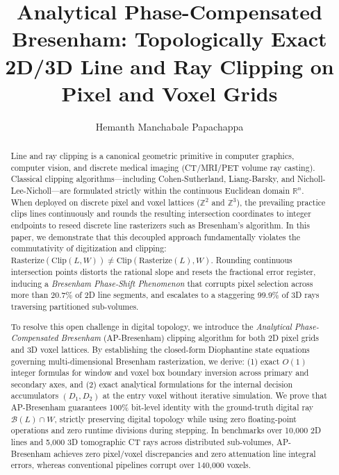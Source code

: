 \documentclass[runningheads]{llncs}
\begin{document}
%
\title{Analytical Phase-Compensated Bresenham: Topologically Exact 2D/3D Line and Ray Clipping on Pixel and Voxel Grids}
%
%
\author{Hemanth Manchabale Papachappa}
%
%
%
\maketitle              %
%
\begin{abstract}
Line and ray clipping is a canonical geometric primitive in computer graphics, computer vision, and discrete medical imaging (CT/MRI/PET volume ray casting). Classical clipping algorithms---including Cohen-Sutherland, Liang-Barsky, and Nicholl-Lee-Nicholl---are formulated strictly within the continuous Euclidean domain $\mathbb{R}^n$. When deployed on discrete pixel and voxel lattices ($\mathbb{Z}^2$ and $\mathbb{Z}^3$), the prevailing practice clips lines continuously and rounds the resulting intersection coordinates to integer endpoints to reseed discrete line rasterizers such as Bresenham's algorithm. In this paper, we demonstrate that this decoupled approach fundamentally violates the commutativity of digitization and clipping: $\mathrm{Rasterize}(\mathrm{Clip}(L, W)) \ne \mathrm{Clip}(\mathrm{Rasterize}(L), W)$. Rounding continuous intersection points distorts the rational slope and resets the fractional error register, inducing a \emph{Bresenham Phase-Shift Phenomenon} that corrupts pixel selection across more than 20.7\% of 2D line segments, and escalates to a staggering 99.9\% of 3D rays traversing partitioned sub-volumes.

To resolve this open challenge in digital topology, we introduce the \emph{Analytical Phase-Compensated Bresenham} (AP-Bresenham) clipping algorithm for both 2D pixel grids and 3D voxel lattices. By establishing the closed-form Diophantine state equations governing multi-dimensional Bresenham rasterization, we derive: (1) exact $O(1)$ integer formulas for window and voxel box boundary inversion across primary and secondary axes, and (2) exact analytical formulations for the internal decision accumulators $(D_1, D_2)$ at the entry voxel without iterative simulation. We prove that AP-Bresenham guarantees 100\% bit-level identity with the ground-truth digital ray $\mathcal{B}(L) \cap W$, strictly preserving digital topology while using zero floating-point operations and zero runtime divisions during stepping. In benchmarks over 10,000 2D lines and 5,000 3D tomographic CT rays across distributed sub-volumes, AP-Bresenham achieves zero pixel/voxel discrepancies and zero attenuation line integral errors, whereas conventional pipelines corrupt over 140,000 voxels.

\end{abstract}
%
%
%
\end{document}
